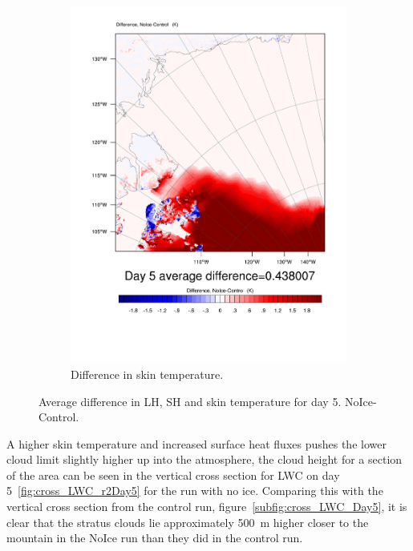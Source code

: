 \begin{figure}
		\begin{subfigure}{0.48\textwidth}
		\includegraphics[width=\textwidth]{results/noice/diff_NoIce_skintemp_Day5.pdf}
		\caption{Difference in skin temperature.}
		\label{subfig:skin_r2Day5}
	\end{subfigure}
	\caption{Average difference in LH, SH and skin temperature for day 5. NoIce-Control.}
	\label{fig:lhshskin_r2Day5}
\end{figure}

A higher skin temperature and increased surface heat fluxes pushes the lower cloud limit slightly higher up into the atmosphere, the cloud height for a section of the area can be seen in the vertical cross section for LWC on day 5~\ref{fig:cross_LWC_r2Day5} for the run with no ice. Comparing this with the vertical cross section from the control run, figure~\ref{subfig:cross_LWC_Day5}, it is clear that the stratus clouds lie approximately 500~m higher closer to the mountain in the NoIce run than they did in the control run.

